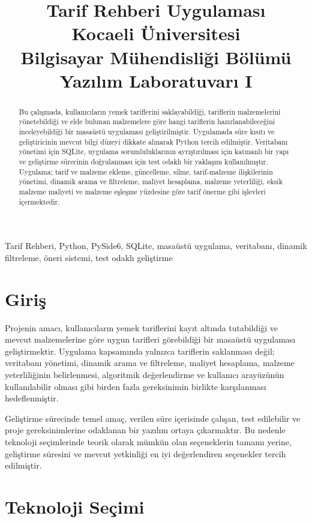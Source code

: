 \documentclass[conference]{IEEEtran}
\title{Tarif Rehberi Uygulaması\\
\large Kocaeli Üniversitesi\\
Bilgisayar Mühendisliği Bölümü\\
Yazılım Laboratuvarı I}
\author{\IEEEauthorblockN{Alper Aydın\\
	190201064\\
	190201064@kocaeli.edu.tr}
}
\begin{document}
\maketitle
\begin{abstract}
Bu çalışmada, kullanıcıların yemek tariflerini saklayabildiği, tariflerin malzemelerini yönetebildiği ve elde bulunan malzemelere göre hangi tariflerin hazırlanabileceğini inceleyebildiği bir masaüstü uygulaması geliştirilmiştir. Uygulamada süre kısıtı ve geliştiricinin mevcut bilgi düzeyi dikkate alınarak Python tercih edilmiştir. Veritabanı yönetimi için SQLite, uygulama sorumluluklarının ayrıştırılması için katmanlı bir yapı ve geliştirme sürecinin doğrulanması için test odaklı bir yaklaşım kullanılmıştır. Uygulama; tarif ve malzeme ekleme, güncelleme, silme, tarif-malzeme ilişkilerinin yönetimi, dinamik arama ve filtreleme, maliyet hesaplama, malzeme yeterliliği, eksik malzeme maliyeti ve malzeme eşleşme yüzdesine göre tarif önerme gibi işlevleri içermektedir.
\end{abstract}

\begin{IEEEkeywords}
Tarif Rehberi, Python, PySide6, SQLite, masaüstü uygulama, veritabanı, dinamik filtreleme, öneri sistemi, test odaklı geliştirme
\end{IEEEkeywords}

\section{Giriş}
Projenin amacı, kullanıcıların yemek tariflerini kayıt altında tutabildiği ve mevcut malzemelerine göre uygun tarifleri görebildiği bir masaüstü uygulaması geliştirmektir. Uygulama kapsamında yalnızca tariflerin saklanması değil; veritabanı yönetimi, dinamik arama ve filtreleme, maliyet hesaplama, malzeme yeterliliğinin belirlenmesi, algoritmik değerlendirme ve kullanıcı arayüzünün kullanılabilir olması gibi birden fazla gereksinimin birlikte karşılanması hedeflenmiştir.

Geliştirme sürecinde temel amaç, verilen süre içerisinde çalışan, test edilebilir ve proje gereksinimlerine odaklanan bir yazılım ortaya çıkarmaktır. Bu nedenle teknoloji seçimlerinde teorik olarak mümkün olan seçeneklerin tamamı yerine, geliştirme süresini ve mevcut yetkinliği en iyi değerlendiren seçenekler tercih edilmiştir.

\section{Teknoloji Seçimi}
\end{document}
